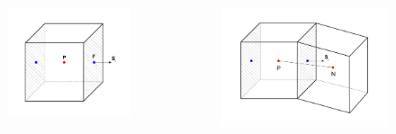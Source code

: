 \begin{frame}
\begin{columns}
        \begin{figure}[h]
            \begin{center}
                \includegraphics[trim=11mm 11mm 11mm 11mm, clip, scale=0.25]{Imagenes/VF1}
            \end{center}
        \end{figure} 
        \vspace*{-0.8cm}
        \begin{figure}[h]
            \begin{center}
                \includegraphics[trim=10mm 10mm 10mm 10mm, clip, scale=0.25]{Imagenes/VF2}
            \end{center}
        \end{figure}         
                                               

\end{columns}
\end{frame}

